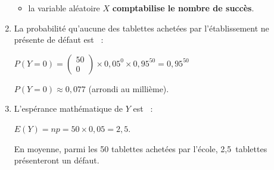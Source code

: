 \begin{corrige}
\begin{enumerate}
{\begin{itemize}
\begin{itemize}[label=---]
                         \item %
                         \textit{échec}, de probabilité $1-p$ ;
                    \end{itemize}
                    \item la variable aléatoire $X$ \textbf{comptabilise le nombre de succès}.
                    \par
               \end{itemize}
          }
          \item %
          La probabilité qu'aucune des tablettes achetées par l'établissement ne présente de défaut est ~:
          \par
          $P(Y=0)=\begin{pmatrix} 50 \\ 0 \end{pmatrix} \times 0,05^0 \times 0,95^{50} = 0,95^{50}$
          \par
          $P(Y=0) \approx 0,077$ (arrondi au millième).
          \par
          \par
          \item %
          L'espérance mathématique de $Y$ est ~:
          \par
          $E(Y)=np=50 \times 0,05=2,5$.
          \par
          En moyenne, parmi les 50 tablettes achetées par l'école, 2,5~tablettes présenteront un défaut.
          \par
          \par
     \end{enumerate}
\end{corrige}
